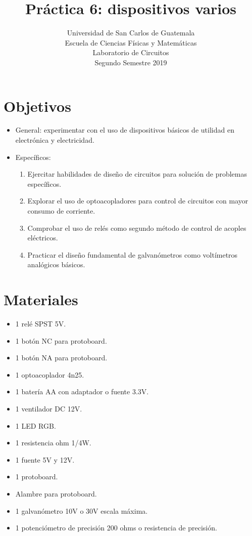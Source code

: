 \documentclass[letterpaper, 12 pt, conference]{ieeeconf}  %
\title{\LARGE \bf
Práctica 6: dispositivos varios 
}
\author{Universidad de San Carlos de Guatemala \\%
Escuela de Ciencias Físicas y Matemáticas\\
Laboratorio de Circuitos\\
Segundo Semestre 2019
}
\begin{document}
\maketitle
\thispagestyle{empty}
\pagestyle{empty}

\section{Objetivos}
\begin{itemize}
    \item General: experimentar con el uso de dispositivos básicos de utilidad en electrónica y electricidad.
    \item Específicos:
    \begin{enumerate}
    \item Ejercitar habilidades de diseño de circuitos para solución de problemas específicos.
    \item Explorar el uso de optoacopladores para control de circuitos con mayor consumo de corriente.
    \item Comprobar el uso de relés como segundo método de control de acoples eléctricos.
    \item Practicar el diseño fundamental de galvanómetros como voltímetros analógicos básicos.
\end{enumerate}
\end{itemize}


\section{Materiales}
\begin{itemize}
    \item 1 relé SPST 5V.
    \item 1 botón NC para protoboard.
    \item 1 botón NA para protoboard.
    \item 1 optoacoplador 4n25.
    \item 1 batería AA con adaptador o fuente 3.3V.
    \item 1 ventilador DC 12V.
    \item 1 LED RGB.
    \item 1 resistencia ohm 1/4W.
    \item 1 fuente 5V y 12V.
    \item 1 protoboard.
    \item Alambre para protoboard.
    \item 1 galvanómetro 10V o 30V escala máxima.
    \item 1 potenciómetro de precisión 200 ohms o resistencia de precisión.
\end{itemize}
\pagebreak
\end{document}
